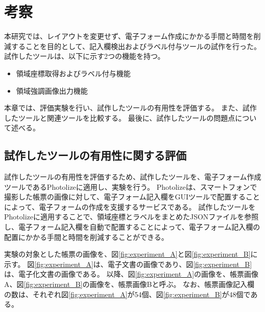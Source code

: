 \chapter{考察}\label{cha:Discussion}
本研究では、レイアウトを変更せず、電子フォーム作成にかかる手間と時間を削減することを目的として、記入欄検出およびラベル付与ツールの試作を行った。
試作したツールは、以下に示す2つの機能を持つ。

\begin{itemize}
  \item 領域座標取得およびラベル付与機能
  \item 領域強調画像出力機能
\end{itemize}

本章では、評価実験を行い、試作したツールの有用性を評価する。
また、試作したツールと関連ツールを比較する。
最後に、試作したツールの問題点について述べる。

\section{試作したツールの有用性に関する評価}\label{sec:evalue_usefulness}
試作したツールの有用性を評価するため、試作したツールを、電子フォーム作成ツールであるPhotolize\cite{Photolize}に適用し、実験を行う。
Photolizeは、スマートフォンで撮影した帳票の画像に対して、電子フォーム記入欄をGUIツールで配置することによって、電子フォームの作成を支援するサービスである。
試作したツールをPhotolizeに適用することで、領域座標とラベルをまとめたJSONファイルを参照し、電子フォーム記入欄を自動で配置することによって、電子フォーム記入欄の配置にかかる手間と時間を削減することができる。

実験の対象とした帳票の画像を、図\ref{fig:experiment_A}と図\ref{fig:experiment_B}に示す。
図\ref{fig:experiment_A}は、電子文書の画像であり、図\ref{fig:experiment_B}は、電子化文書の画像である。
以降、図\ref{fig:experiment_A}の画像を、帳票画像A、図\ref{fig:experiment_B}の画像を、帳票画像Bと呼ぶ。
なお、帳票画像記入欄の数は、それぞれ図\ref{fig:experiment_A}が54個、図\ref{fig:experiment_B}が48個である。

